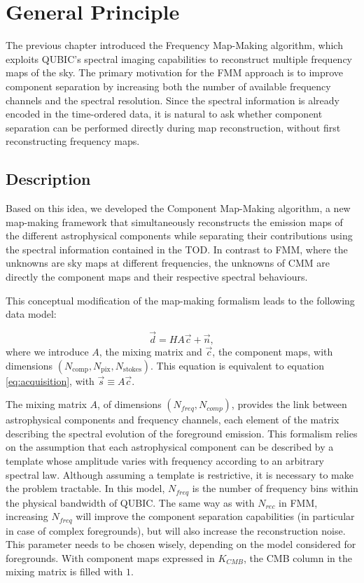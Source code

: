 \documentclass[../../thesis.tex]{subfiles}
\begin{document}
\section{General Principle}

The previous chapter introduced the Frequency Map-Making algorithm, which exploits QUBIC's spectral imaging capabilities to reconstruct multiple frequency maps of the sky. The primary motivation for the FMM approach is to improve component separation by increasing both the number of available frequency channels and the spectral resolution. Since the spectral information is already encoded in the time-ordered data, it is natural to ask whether component separation can be performed directly during map reconstruction, without first reconstructing frequency maps.

\subsection{Description}

Based on this idea, we developed the Component Map-Making algorithm, a new map-making framework that simultaneously reconstructs the emission maps of the different astrophysical components while separating their contributions using the spectral information contained in the TOD. In contrast to FMM, where the unknowns are sky maps at different frequencies, the unknowns of CMM are directly the component maps and their respective spectral behaviours.

This conceptual modification of the map-making formalism leads to the following data model:

\begin{equation} \label{eq:cmm}
    \vec{d} = H A \vec{c} + \vec{n},
\end{equation}
where we introduce $A$, the mixing matrix and $\vec{c}$, the component maps, with dimensions $(N_{\mathrm{comp}}, N_{\mathrm{pix}}, N_{\mathrm{stokes}})$. This equation is equivalent to equation \ref{eq:acquisition}, with $\vec{s} \equiv A\vec{c}$.

The mixing matrix $A$, of dimensions $(N_{freq}, N_{comp})$, provides the link between astrophysical components and frequency channels, each element of the matrix describing the spectral evolution of the foreground emission. This formalism relies on the assumption that each astrophysical component can be described by a template whose amplitude varies with frequency according to an arbitrary spectral law. Although assuming a template is restrictive, it is necessary to make the problem tractable. In this model, $N_{freq}$ is the number of frequency bins within the physical bandwidth of QUBIC. The same way as with $N_{rec}$ in FMM, increasing $N_{freq}$ will improve the component separation capabilities (in particular in case of complex foregrounds), but will also increase the reconstruction noise. This parameter needs to be chosen wisely, depending on the model considered for foregrounds. With component maps expressed in $K_{CMB}$, the CMB column in the mixing matrix is filled with $1$.
\end{document}
